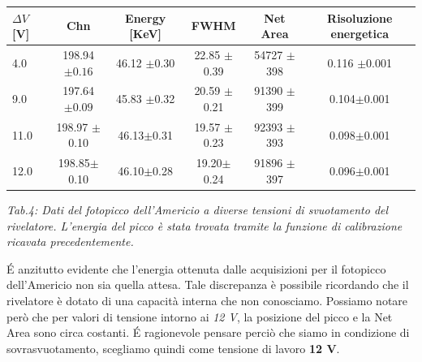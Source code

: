 \documentclass[a4paper]{article}
\begin{document}
\begin{center} 
		
		\begin{tabular}{lccccc}
			\hline
			\hline
			\textbf{$\Delta V$} [V]   &     \textbf{Chn}		&     \textbf{Energy} [KeV]		&     \textbf{FWHM}		&     \textbf{Net Area} 	& \textbf{Risoluzione energetica} \\
			\hline
			\hline
				       4.0             &	198.94	$\pm0.16$		&		46.12	$\pm$0.30		&				22.85 $\pm$0.39		&			54727 $\pm$ 398 & 0.116 $\pm$0.001\\
				       9.0             &	197.64 $\pm0.09$			&		45.83	$\pm$0.32		&				20.59 $\pm$0.21		&			91390 $\pm$ 399&0.104$\pm$0.001\\
				       11.0		        &	198.97 $\pm$0.10			&		46.13$\pm$0.31			&				19.57 $\pm$0.23		&			92393 $\pm$ 393&0.098$\pm$0.001\\
				       12.0		        & 	198.85$\pm$0.10	 			&		46.10$\pm$0.28			&				19.20$\pm$0.24		&			91896 $\pm$ 397&0.096$\pm$0.001\\
			\hline
			\hline
		\end{tabular}
		\linebreak
		
		\emph{Tab.4: Dati del fotopicco dell'Americio a diverse tensioni di svuotamento del rivelatore. L'energia del picco è 							 stata trovata tramite la funzione di calibrazione ricavata precedentemente.  } 
	\end{center} 	
\'E anzitutto evidente che l'energia ottenuta dalle acquisizioni per il fotopicco dell'Americio non sia quella attesa. Tale discrepanza è possibile ricordando che il rivelatore è dotato di una capacità interna che non conosciamo. 
Possiamo notare però che per valori di tensione intorno ai \emph{12 V}, la posizione del picco e la Net Area sono circa costanti. \'E ragionevole pensare perciò che siamo in condizione di sovrasvuotamento, scegliamo quindi come tensione di lavoro \textbf{12 V}.
\\
\end{document}
